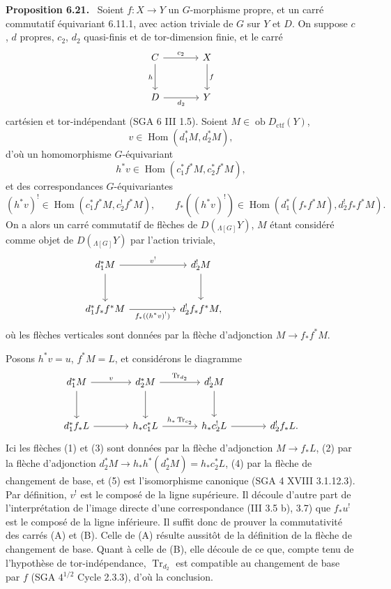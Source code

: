 \documentclass[11pt]{article}
\newenvironment{statement}[1]{\par\medskip\noindent\textbf{#1.}\ }{\par\medskip}
\DeclareMathOperator{\Hom}{Hom}
\providecommand{\Tr}{\operatorname{Tr}}
\providecommand{\Tr}{\operatorname{Tr}}
\providecommand{\Ob}{\operatorname{ob}}
\providecommand{\Tr}{\operatorname{Tr}}
\providecommand{\Hom}{\operatorname{Hom}}
\providecommand{\Ob}{\operatorname{ob}}
\providecommand{\Tr}{\operatorname{Tr}}
\providecommand{\Ob}{\operatorname{Ob}}
\begin{document}
\begin{statement}{Proposition 6.21}
Soient $f:X\to Y$ un $G$-morphisme propre, et un carré commutatif équivariant 6.11.1, avec action triviale de $G$ sur $Y$ et $D$. On suppose $c$, $d$ propres, $c_2$, $d_2$ quasi-finis et de tor-dimension finie, et le carré
\[
\begin{tikzcd}[column sep=large,row sep=large]
C \arrow[r,"c_2"] \arrow[d,"h"'] & X \arrow[d,"f"]\\
D \arrow[r,"d_2"'] & Y
\end{tikzcd}
\]
cartésien et tor-indépendant (SGA 6 III 1.5). Soient $M\in\Ob D_{\mathrm{ctf}}(Y)$,
\[
v\in\Hom(d_1^*M,d_2^*M),
\]
d'où un homomorphisme $G$-équivariant
\[
h^*v\in\Hom(c_1^*f^*M,c_2^*f^*M),
\]
et des correspondances $G$-équivariantes
\[
(h^*v)^!\in\Hom(c_1^*f^*M,c_2^!f^*M),
\qquad
f_*((h^*v)^!)\in\Hom(d_1^*(f_*f^*M),d_2^!f_*f^*M).
\]
On a alors un carré commutatif de flèches de $D({}_{\Lambda[G]}Y)$, $M$ étant considéré comme objet de $D({}_{\Lambda[G]}Y)$ par l'action triviale,
\[
\begin{tikzcd}[column sep=huge,row sep=large]
d_1^*M \arrow[r,"v^!"] \arrow[d] & d_2^!M \arrow[d] & {}\\
d_1^*f_*f^*M \arrow[r,"f_*((h^*v)^!)"'] & d_2^!f_*f^*M,
\end{tikzcd}
\]
où les flèches verticales sont données par la flèche d'adjonction $M\to f_*f^*M$.
\end{statement}

Posons $h^*v=u$, $f^*M=L$, et considérons le diagramme
\[
\begin{tikzcd}[column sep=large,row sep=large]
d_1^*M \arrow[r,"v"] \arrow[d] &
d_2^*M \arrow[r,"\Tr_{d_2}"] \arrow[d] &
d_2^!M \arrow[d] & {}\\
d_1^*f_*L \arrow[r] &
h_*c_1^*L \arrow[r,"h_*\Tr_{c_2}"] &
h_*c_2^!L \arrow[r] &
d_2^!f_*L .
\end{tikzcd}
\]
Ici les flèches (1) et (3) sont données par la flèche d'adjonction $M\to f_*L$, (2) par la flèche d'adjonction $d_2^*M\to h_*h^*(d_2^*M)=h_*c_2^*L$, (4) par la flèche de changement de base, et (5) est l'isomorphisme canonique (SGA 4 XVIII 3.1.12.3). Par définition, $v^!$ est le composé de la ligne supérieure. Il découle d'autre part de l'interprétation de l'image directe d'une correspondance (III 3.5 b), 3.7) que $f_*u^!$ est le composé de la ligne inférieure. Il suffit donc de prouver la commutativité des carrés (A) et (B). Celle de (A) résulte aussitôt de la définition de la flèche de changement de base. Quant à celle de (B), elle découle de ce que, compte tenu de l'hypothèse de tor-indépendance, $\Tr_{d_2}$ est compatible au changement de base par $f$ (SGA $4^{1/2}$ Cycle 2.3.3), d'où la conclusion.
\end{document}
